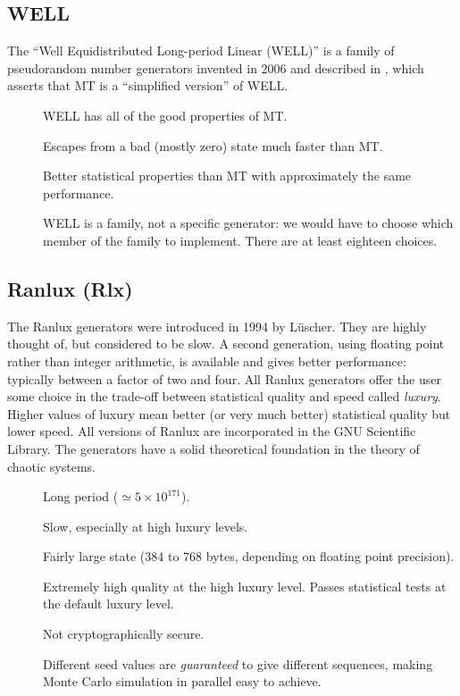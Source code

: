 \documentclass[letterpaper,12pt]{article}
\begin{document}
\subsection{WELL}
The ``Well Equidistributed Long-period Linear (WELL)'' is a family of
pseudorandom number generators invented in 2006 and described in%
\cite{PannetonEtAl:WELL}, which asserts that MT is a ``simplified version''
of WELL.

\begin{description}
\item[\GoodThing]
  WELL has all of the good properties of MT.
\item [\GoodThing]
  Escapes from a bad (mostly zero) state much faster than MT.
\item[\GoodThing]
  Better statistical properties than MT with approximately the same performance.
\item[\PossiblyBadThing]
  WELL is a family, not a specific generator: we would have to choose which
  member of the family to implement. There are at least eighteen choices.
\end{description}


\subsection{Ranlux (Rlx)}
The Ranlux generators were introduced in 1994 by
L\"uscher\cite{Luscher:1994}. They are highly thought of, but considered to
be slow. A second generation, using floating point rather than integer
arithmetic, is available and gives better performance: typically between a
factor of two and four\cite{Luscher:Ranlux2}. All Ranlux generators offer
the user some choice in the trade-off between statistical quality and speed
called {\em luxury}. Higher values of luxury mean better (or very much
better) statistical quality but lower speed. All versions of Ranlux are
incorporated in the GNU Scientific Library\cite{GnuScientificLibrary}.
The generators have a solid theoretical foundation in the theory of chaotic
systems.
\begin{description}
\item[\GoodThing]
  Long period ($\simeq 5 \times 10^{171}$).
\item[\PossiblyBadThing]
  Slow, especially at high luxury levels.
\item[\PossiblyBadThing]
  Fairly large state (384 to 768 bytes, depending on floating point precision).
\item[\GoodThing]
  Extremely high quality at the high luxury level. Passes statistical tests
  at the default luxury level.
\item[\PossiblyBadThing]
  Not cryptographically secure.
\item[\GoodThing]
  Different seed values are {\em guaranteed} to give different sequences,
  making Monte Carlo simulation in parallel easy to achieve.
\end{description}
\end{document}
